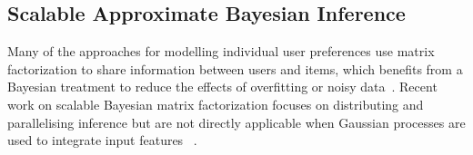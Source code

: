 

\subsection{Scalable Approximate Bayesian Inference}

Many of the approaches for modelling individual user preferences use matrix factorization 
to share information between users and items,
which benefits from a Bayesian treatment to reduce the effects of overfitting or noisy data~\citep{saha2015scalable}.
Recent work on scalable Bayesian matrix factorization focuses on distributing and 
parallelising inference but %
are not directly applicable when Gaussian processes are used to integrate input features
 ~\citep{ahn2015large,saha2015scalable,vander2017distributed,chen2018large}. 

